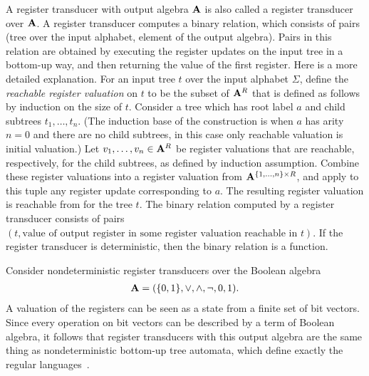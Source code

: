 A register transducer with output algebra  $\mathbf{A}$ is also called  a register transducer over $\mathbf{A}$.
A  register transducer computes a binary relation, which consists of pairs 
    (tree over the input alphabet, element of the output algebra).
Pairs in this relation are obtained by  executing the register updates on the input tree in a bottom-up way, and then returning the value of the first register. Here is a more detailed explanation.  For an input  tree $t$ over the input alphabet $\Sigma$, define the \emph{reachable register valuation} on $t$ to be the subset  of $\mathbf{A}^R$ that is  defined as follows by  induction on the size of $t$. Consider a tree which has root label $a$ and child subtrees $t_1,\ldots,t_n$. (The induction base of the construction is when $a$ has arity $n=0$ and there are no child subtrees, in this case only reachable valuation is initial valuation.) Let $v_1,\ldots,v_n \in \mathbf{A}^R$ be  register valuations that are reachable, respectively,  for the child subtrees, as defined by induction assumption. Combine these register valuations into a register valuation from $\mathbf{A}^{\{1,\ldots,n\} \times R}$, and apply to this tuple any register update corresponding to $a$. The resulting register valuation is reachable from for the tree $t$. The binary relation computed by a register transducer consists of pairs $(t,\text{value of output register in  some register valuation reachable in $t$})$. If the register transducer is deterministic, then the binary relation is a function. 

\begin{example}
    Consider nondeterministic register transducers over the Boolean algebra
    \begin{align*}
    \mathbf{A} = (\{0,1\},\lor, \land, \neg, 0, 1).
    \end{align*}
    A valuation of the registers can be seen as a state from a finite set of bit vectors. Since every operation on bit vectors can be described  by a term of Boolean algebra, it follows that  register transducers with this output algebra are the same thing as  nondeterministic bottom-up tree automata, which define exactly the regular languages~\cite[Section 2]{thatcherGeneralizedFiniteAutomata1968}. 
\end{example}

